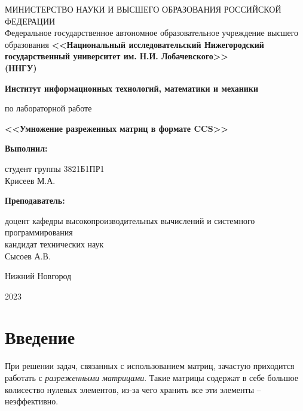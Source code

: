 \documentclass[a4paper,12pt]{article}
\begin{document}
\begin{titlepage}
 \begin{center}
{\small МИНИСТЕРСТВО НАУКИ И ВЫСШЕГО ОБРАЗОВАНИЯ РОССИЙСКОЙ ФЕДЕРАЦИИ\\
 Федеральное государственное автономное образовательное учреждение
высшего образования
}
\textbf{<<Национальный исследовательский
Нижегородский государственный университет им. Н.И. Лобачевского>>\\
(ННГУ)\\}

\vspace*{1cm}

\textbf{Институт информационных технологий, математики и механики}

\vspace*{3cm}

\textbf{}

по лабораторной работе

\vspace{1em}

\textbf{\large<<Умножение разреженных матриц в формате CCS>>}

\end{center}

\vspace{2cm}

\begin{flushright}
\parbox{8.5cm}{
\textbf{Выполнил:}

студент группы 3821Б1ПР1\\
Крисеев М.А.

\textbf{Преподаватель:}

доцент кафедры высокопроизводительных вычислений и системного программирования\\
кандидат технических наук\\
Сысоев А.В.
}
\end{flushright}

\flushbottom

\vfill

\begin{center}
 Нижний Новгород

 2023
\end{center}

\end{titlepage}

\tableofcontents

\newpage

\section{Введение}
\par
При решении задач, связанных с использованием матриц, зачастую приходится работать с \textit{разреженными матрицами}.
Такие матрицы содержат в себе большое колисество нулевых элементов, из-за чего хранить все эти элементы -- неэффективно.
\end{document}
